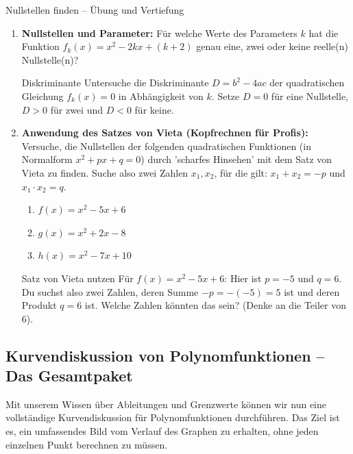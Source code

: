 \begin{aufgabenumgebung}{Nullstellen finden – Übung und Vertiefung}
\begin{enumerate}
    \item \textbf{Nullstellen und Parameter:}
        Für welche Werte des Parameters $k$ hat die Funktion $f_k(x) = x^2 - 2kx + (k+2)$ genau eine, zwei oder keine reelle(n) Nullstelle(n)?
        \begin{tippumgebung}{Diskriminante}
        Untersuche die Diskriminante $D = b^2-4ac$ der quadratischen Gleichung $f_k(x)=0$ in Abhängigkeit von $k$.
        Setze $D=0$ für eine Nullstelle, $D>0$ für zwei und $D<0$ für keine.
        \end{tippumgebung}
    \item \textbf{Anwendung des Satzes von Vieta (Kopfrechnen für Profis):}
        Versuche, die Nullstellen der folgenden quadratischen Funktionen (in Normalform $x^2+px+q=0$) durch 'scharfes Hinsehen' mit dem Satz von Vieta zu finden. Suche also zwei Zahlen $x_1, x_2$, für die gilt: $x_1+x_2 = -p$ und $x_1 \cdot x_2 = q$.
        \begin{enumerate}[label=(\alph*)]
            \item $f(x) = x^2 - 5x + 6$
            \item $g(x) = x^2 + 2x - 8$
            \item $h(x) = x^2 - 7x + 10$
        \end{enumerate}
        \begin{tippumgebung}{Satz von Vieta nutzen}
        Für $f(x) = x^2 - 5x + 6$: Hier ist $p=-5$ und $q=6$. Du suchst also zwei Zahlen, deren Summe $-p = -(-5) = 5$ ist und deren Produkt $q=6$ ist. Welche Zahlen könnten das sein? (Denke an die Teiler von 6).
        \end{tippumgebung}
\end{enumerate}
\end{aufgabenumgebung}





\subsection{Kurvendiskussion von Polynomfunktionen – Das Gesamtpaket}
\label{subsec:kurvendiskussion_polynome}

Mit unserem Wissen über Ableitungen und Grenzwerte können wir nun eine vollständige Kurvendiskussion für Polynomfunktionen durchführen. Das Ziel ist es, ein umfassendes Bild vom Verlauf des Graphen zu erhalten, ohne jeden einzelnen Punkt berechnen zu müssen.


